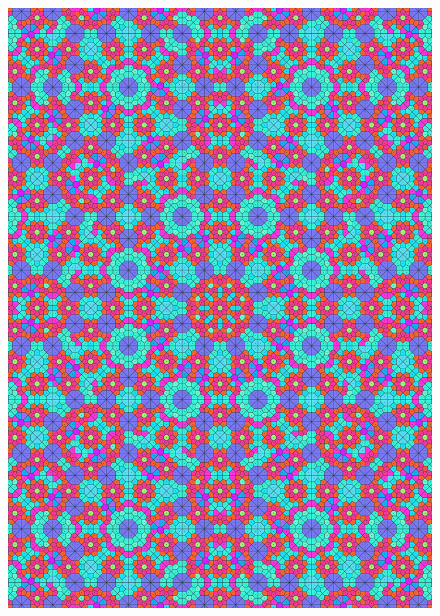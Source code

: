 \documentclass[text.tex]{subfiles}
\begin{document}
\begin{figure}[h!]
\centering
\includegraphics[width=1\textwidth]{img/results/circle8/quasi_circle_116260_(-4522_1875alpha_4).pdf}
\end{figure}
\end{document}
